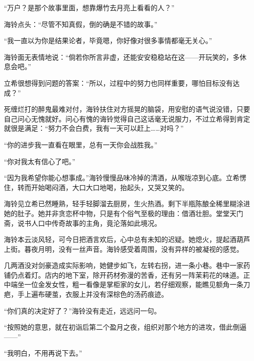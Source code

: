 \documentclass{article}
\begin{document}
“万户？是那个故事里面，想靠爆竹去月亮上看看的人？”



海铃点头：“尽管不知真假，倒的确是不错的故事。”



“我一直以为你是结果论者，毕竟嗯，你好像对很多事情都毫无关心。”



海铃面无表情地说：“倘若你所言非虚，还能安安稳稳站在这——开玩笑的，多休息会吧。”



立希很想得到问题的答案：“所以，过程中的努力也同样重要，哪怕目标没有达成？”



死缠烂打的醉鬼最难对付，海铃扶住对方摇晃的脑袋，用安慰的语气说没错，只要自己问心无愧就好。问心有愧的诲铃觉得自己这话毫无说服力，不过立希得到肯定就很是满足：“努力不会白费，我有一天可以赶上……对吗？”



“你的进步我一直看在眼里，总有一天你会战胜我。”



“你对我太有信心了吧。”



“因为我希望你能心想事成。”海铃慢慢品味冷掉的清酒，从喉咙凉到心底。立希愣住，转而开始喝闷酒，大口大口地喝，抬起头，又哭又笑的。



海铃见立希已然睡熟，轻手轻脚溜去厨房，生火热酒。剩下半瓶陈酿全稀里糊涂进她的肚子。她并非贪恋杯中物，只是有个俗气至极的理由：借酒壮胆。堂堂天门斋，说书人口中传奇故事的主角，竟沦落如此境况。



海铃本云淡风轻，可今日把酒言欢后，心中总有未知的迟疑。她熄火，提起酒葫芦上街。暮夜月明，没有一丝声音。海铃感受着周围，没有异样的被凝视的感觉。



几两酒没对剑豪造成实际影响，她健步如飞，左转右拐，进一条小巷。巷中一家药铺仍点着灯。店内的地下室，除开药材弥漫的苦香，还有另一阵茉莉花的味道。正中端坐一位金发女性，粗一看像是掌柜家的女儿，若仔细观察，能瞧见额角一条刀疤，手上遍布硬茧，衣服上并没有深棕色的汤药痕迹。



“你们真的决定好了？”海铃没有走近，远远问一句。



“按照她的意思，就在初诣后第二个盈月之夜，组织对那个地方的进攻，借此倒逼——”



“我明白，不用再说下去。”
\end{document}
